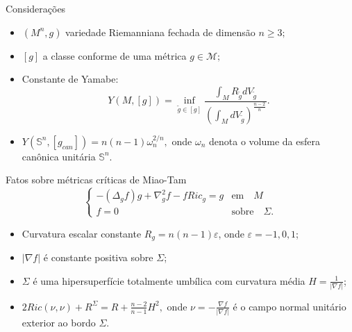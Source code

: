 \documentclass[blue]{beamer}
\begin{document}


\begin{frame}{Considerações}\pause
\begin{itemize}
	\item $(M^n, g)$ variedade Riemanniana fechada de dimensão $n\geq 3;$\pause
	\item $[g]$ a classe conforme de uma métrica $g\in \mathcal{M};$\pause
	\item Constante de Yamabe: $$Y(M, [g]) = \inf_{\tilde{g}\in [g]} \frac{\int_{M} R_{\tilde{g}}dV_{\tilde{g}}} {(\int_{M}dV_{\tilde{g}})^{\frac{n-2}{n}}}.$$\pause
	\item $Y(\mathbb{S}^{n}, [g_{can}]) = n(n-1)\omega_{n}^{2/n},$ onde $\omega_{n}$ denota o volume da esfera canônica unitária $\mathbb{S}^{n}$.
\end{itemize}

\end{frame}






\begin{frame}{Fatos sobre métricas críticas de Miao-Tam}\pause
	\begin{equation*}\label{Dirichlet}
\begin{cases}
-(\Delta_{g} f)g+\nabla_{g}^2f-fRic_{g}=g & \mbox{em}  \quad M\\
f=0 & \mbox{sobre}  \quad \Sigma.
\end{cases}
\end{equation*}\pause

\begin{itemize}
	\item Curvatura escalar constante $R_{g}=n(n-1)\varepsilon$, onde $\varepsilon=-1,0,1$;\pause
	\item $|\nabla f|$ é constante positiva sobre $\Sigma$;\pause
	\item $\Sigma$ é uma hipersuperfície totalmente umbílica com curvatura média $H=\frac{1}{|\nabla f|}$;\pause
	\item $2Ric(\nu, \nu) + R^{\Sigma} = R+ \frac{n-2}{n-1}H^2,$ onde $\nu =- \frac{\nabla f}{|\nabla f|}$ é o campo normal unitário exterior ao bordo $\Sigma$.
\end{itemize}
\end{frame}

\end{document}
